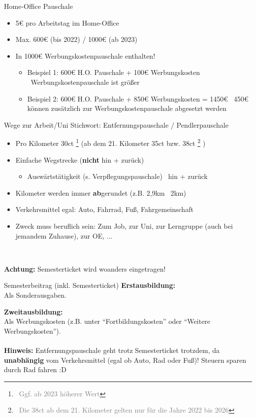 \documentclass{beamer}
\newcommand{\n}{\hfill\\\vspace{0.25cm}}
\let\oldfootnote\footnote
\renewcommand{\footnote}[1]
{%
	\oldfootnote
	{
		\tiny
		\textcolor{gray}{\ #1}
	}%
}
\begin{document}
			\begin{frame}{Home-Office Pauschale}
				\begin{itemize}
					\item 5€ pro Arbeitstag im Home-Office
					\item Max. 600€ (bis 2022) / 1000€ (ab 2023)
					\item In 1000€ Werbungskostenpauschale enthalten!
					\begin{itemize}
						\item Beispiel 1: 600€ H.O. Pauschale + 100€ Werbungskosten \textrightarrow\ Werbungskostenpauschale ist größer
						\item Beispiel 2: 600€ H.O. Pauschale + 850€ Werbungskosten = 1450€ \textrightarrow\ 450€ können zusätzlich zur Werbungskostenpauschale abgesetzt werden
					\end{itemize}
				\end{itemize}
			\end{frame}
		
			\begin{frame}{Wege zur Arbeit/Uni}
				Stichwort: Entfernungspauschale / Pendlerpauschale\n
				
				\begin{itemize}
					\item Pro Kilometer 30ct\footnote{Ggf. ab 2023 höherer Wert} (ab dem 21. Kilometer 35ct bzw. 38ct\footnote{Die 38ct ab dem 21. Kilometer gelten nur für die Jahre 2022 bis 2026})
					\item Einfache Wegstrecke (\textbf{nicht} hin + zurück)
					\begin{itemize}
						\item Auswärtstätigkeit (s. Verpflegungspauschale) \textrightarrow\ hin + zurück
					\end{itemize}
					\item Kilometer werden immer \textbf{ab}gerundet (z.B. 2,9km \textrightarrow\ 2km)
					\item Verkehrsmittel egal: Auto, Fahrrad, Fuß, Fahrgemeinschaft
					\item Zweck muss beruflich sein: Zum Job, zur Uni, zur Lerngruppe (auch bei jemandem Zuhause), zur OE, ...
				\end{itemize}\n\pause
				
				\textbf{Achtung:} Semesterticket wird woanders eingetragen!
			\end{frame}
		
			\begin{frame}{Semesterbeitrag (inkl. Semesterticket)}
				\textbf{Erstausbildung:}\\
				Als Sonderausgaben.\n
				
				\textbf{Zweitausbildung:}\\
				Als Werbungskosten (z.B. unter "`Fortbildungskosten"' oder "`Weitere Werbungskosten"').\n
				\hfill\\\pause
				\textbf{Hinweis:} Entfernungspauschale geht trotz Semesterticket trotzdem, da \textbf{unabhängig} vom Verkehrsmittel (egal ob Auto, Rad oder Fuß)! Steuern sparen durch Rad fahren :D\n\pause
			\end{frame}
		
\end{document}
